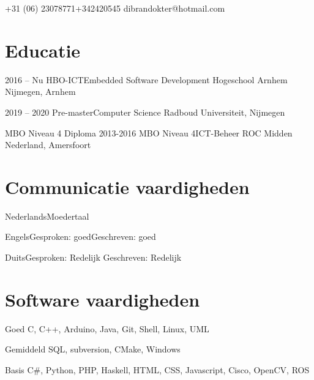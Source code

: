 \documentclass{tccv}
\begin{document}
    {+31 (06) 23078771\newline+342420545}
    {dibrandokter@hotmail.com}

\section{Educatie}

\begin{yearlist}

\item{2016 -- Nu}
     {HBO-ICT\newline Embedded Software Development}
     {Hogeschool Arnhem Nijmegen, Arnhem}
     
\item{2019 -- 2020}
	 {Pre-master\newline Computer Science}
	 {Radboud Universiteit, Nijmegen}

\item[MBO Niveau 4 Diploma]{2013-2016}
     {MBO Niveau 4\newline ICT-Beheer}
     {ROC Midden Nederland, Amersfoort}

\end{yearlist}

\section{Communicatie vaardigheden}

\begin{factlist}
\item{Nederlands}{Moedertaal}
\item{Engels}{Gesproken: goed\newline Geschreven: goed}
\item{Duits}{Gesproken: Redelijk \newline Geschreven: Redelijk}
\end{factlist}

\section{Software vaardigheden}

\begin{factlist}

\item{Goed}
     {C, C++, Arduino, Java, Git, Shell, Linux, UML}

\item{Gemiddeld}
     {SQL, subversion, CMake, Windows}

\item{Basis}
     {C\#, Python, PHP, Haskell, HTML, CSS, Javascript, Cisco, OpenCV, ROS}

\end{factlist}
\end{document}

